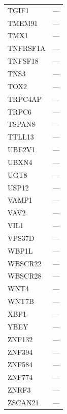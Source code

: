 \begin{longtable}{ll}
  TGIF1 & --- \\
  TMEM91 & --- \\
  TMX1 & --- \\
  TNFRSF1A & --- \\
  TNFSF18 & --- \\
  TNS3 & --- \\
  TOX2 & --- \\
  TRPC4AP & --- \\
  TRPC6 & --- \\
  TSPAN8 & --- \\
  TTLL13 & --- \\
  UBE2V1 & --- \\
  UBXN4 & --- \\
  UGT8 & --- \\
  USP12 & --- \\
  VAMP1 & --- \\
  VAV2 & --- \\
  VIL1 & --- \\
  VPS37D & --- \\
  WBP1L & --- \\
  WBSCR22 & --- \\
  WBSCR28 & --- \\
  WNT4 & --- \\
  WNT7B & --- \\
  XBP1 & --- \\
  YBEY & --- \\
  ZNF132 & --- \\
  ZNF394 & --- \\
  ZNF584 & --- \\
  ZNF774 & --- \\
  ZNRF3 & --- \\
  ZSCAN21 & --- \\
\bottomrule
\end{longtable}

